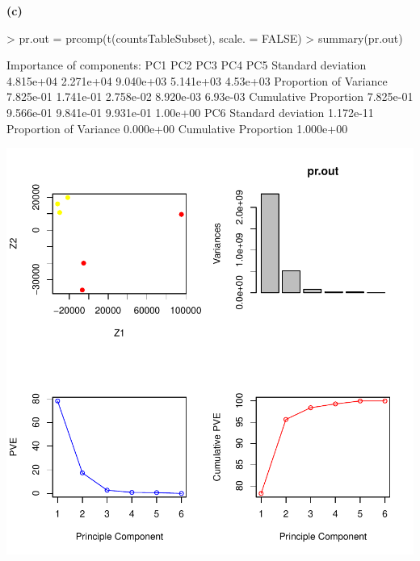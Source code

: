 \documentclass[a4paper]{article}
\renewcommand{\part}[1] {\vspace{.10in} {\bf (#1)}}
\begin{document}
\part{c}
\begin{Schunk}
\begin{Sinput}
> pr.out = prcomp(t(countsTableSubset), scale. = FALSE)
> summary(pr.out)
\end{Sinput}
\begin{Soutput}
Importance of components:
                             PC1       PC2       PC3       PC4      PC5
Standard deviation     4.815e+04 2.271e+04 9.040e+03 5.141e+03 4.53e+03
Proportion of Variance 7.825e-01 1.741e-01 2.758e-02 8.920e-03 6.93e-03
Cumulative Proportion  7.825e-01 9.566e-01 9.841e-01 9.931e-01 1.00e+00
                             PC6
Standard deviation     1.172e-11
Proportion of Variance 0.000e+00
Cumulative Proportion  1.000e+00
\end{Soutput}
\end{Schunk}
\includegraphics{pca-1c}
\end{document}
